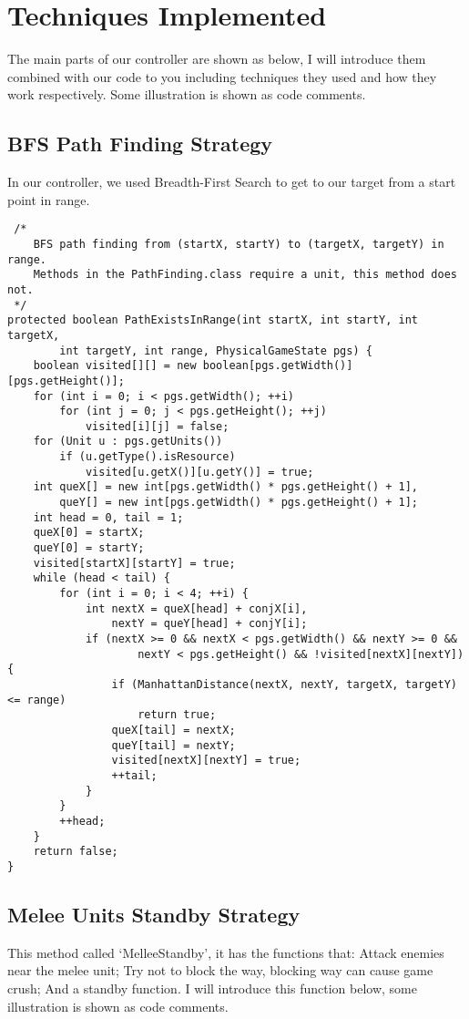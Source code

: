 \section{Techniques Implemented}

The main parts of our controller are shown as below, I will introduce them combined with our code
to you including techniques they used and how they work respectively. Some illustration is shown
as code comments. 

\subsection{BFS Path Finding Strategy}
In our controller, we used Breadth-First Search to get to our target from a start point in range.

\begin{verbatim}
 /*
    BFS path finding from (startX, startY) to (targetX, targetY) in range.
    Methods in the PathFinding.class require a unit, this method does not.
 */
protected boolean PathExistsInRange(int startX, int startY, int targetX,
        int targetY, int range, PhysicalGameState pgs) {
    boolean visited[][] = new boolean[pgs.getWidth()][pgs.getHeight()];
    for (int i = 0; i < pgs.getWidth(); ++i)
        for (int j = 0; j < pgs.getHeight(); ++j)
            visited[i][j] = false;
    for (Unit u : pgs.getUnits())
        if (u.getType().isResource)
            visited[u.getX()][u.getY()] = true;
    int queX[] = new int[pgs.getWidth() * pgs.getHeight() + 1],
        queY[] = new int[pgs.getWidth() * pgs.getHeight() + 1];
    int head = 0, tail = 1;
    queX[0] = startX;
    queY[0] = startY;
    visited[startX][startY] = true;
    while (head < tail) {
        for (int i = 0; i < 4; ++i) {
            int nextX = queX[head] + conjX[i],
                nextY = queY[head] + conjY[i];
            if (nextX >= 0 && nextX < pgs.getWidth() && nextY >= 0 &&
                    nextY < pgs.getHeight() && !visited[nextX][nextY]) {
                if (ManhattanDistance(nextX, nextY, targetX, targetY) <= range)
                    return true;
                queX[tail] = nextX;
                queY[tail] = nextY;
                visited[nextX][nextY] = true;
                ++tail;
            }
        }
        ++head;
    }
    return false;
}
\end{verbatim}

\subsection{Melee Units Standby Strategy}
This method called ‘MelleeStandby’, it has the functions that: Attack enemies near
the melee unit; Try not to block the way, blocking way can cause game crush; And a
standby function. I will introduce this function below, some illustration is shown
as code comments.

